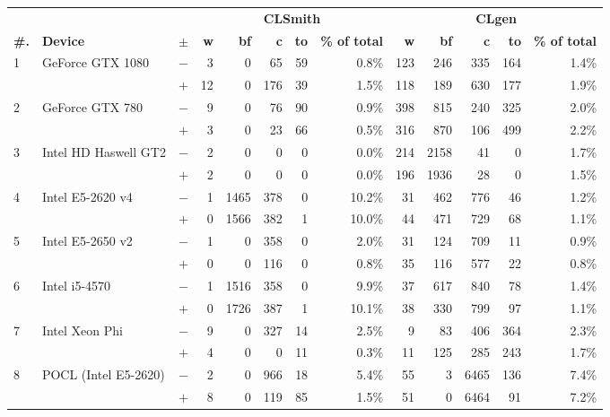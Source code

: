   \begin{tabular}{lll | rrrrr | rrrrr }
  \toprule
  & & & \multicolumn{5}{c|}{\textbf{CLSmith}} & \multicolumn{5}{c}{\textbf{CLgen}} \\
  \textbf{\#.} & \textbf{Device} & $\pm$ &
  \textbf{w} & \textbf{bf} & \textbf{c} & \textbf{to} & \textbf{\% of total} &
  \textbf{w} & \textbf{bf} & \textbf{c} & \textbf{to} & \textbf{\% of total} \\
  \midrule
  \multirow{ 2}{*}{1} & \multirow{ 2}{*}{GeForce GTX 1080} & $-$ & 3 & 0 & 65 & 59 & 0.8\%       & 123 & 246 & 335 & 164 & 1.4\% \\& & $+$ & 12 & 0 & 176 & 39 & 1.5\% & 118 & 189 & 630 & 177 & 1.9\% \\
\hline
\multirow{ 2}{*}{2} & \multirow{ 2}{*}{GeForce GTX 780} & $-$ & 9 & 0 & 76 & 90 & 0.9\%       & 398 & 815 & 240 & 325 & 2.0\% \\& & $+$ & 3 & 0 & 23 & 66 & 0.5\% & 316 & 870 & 106 & 499 & 2.2\% \\
\hline
\multirow{ 2}{*}{3} & \multirow{ 2}{*}{Intel HD Haswell GT2} & $-$ & 2 & 0 & 0 & 0 & 0.0\%       & 214 & 2158 & 41 & 0 & 1.7\% \\& & $+$ & 2 & 0 & 0 & 0 & 0.0\% & 196 & 1936 & 28 & 0 & 1.5\% \\
\hline
\multirow{ 2}{*}{4} & \multirow{ 2}{*}{Intel E5-2620 v4} & $-$ & 1 & 1465 & 378 & 0 & 10.2\%       & 31 & 462 & 776 & 46 & 1.2\% \\& & $+$ & 0 & 1566 & 382 & 1 & 10.0\% & 44 & 471 & 729 & 68 & 1.1\% \\
\hline
\multirow{ 2}{*}{5} & \multirow{ 2}{*}{Intel E5-2650 v2} & $-$ & 1 & 0 & 358 & 0 & 2.0\%       & 31 & 124 & 709 & 11 & 0.9\% \\& & $+$ & 0 & 0 & 116 & 0 & 0.8\% & 35 & 116 & 577 & 22 & 0.8\% \\
\hline
\multirow{ 2}{*}{6} & \multirow{ 2}{*}{Intel i5-4570} & $-$ & 1 & 1516 & 358 & 0 & 9.9\%       & 37 & 617 & 840 & 78 & 1.4\% \\& & $+$ & 0 & 1726 & 387 & 1 & 10.1\% & 38 & 330 & 799 & 97 & 1.1\% \\
\hline
\multirow{ 2}{*}{7} & \multirow{ 2}{*}{Intel Xeon Phi} & $-$ & 9 & 0 & 327 & 14 & 2.5\%       & 9 & 83 & 406 & 364 & 2.3\% \\& & $+$ & 4 & 0 & 0 & 11 & 0.3\% & 11 & 125 & 285 & 243 & 1.7\% \\
\hline
\multirow{ 2}{*}{8} & \multirow{ 2}{*}{POCL (Intel E5-2620)} & $-$ & 2 & 0 & 966 & 18 & 5.4\%       & 55 & 3 & 6465 & 136 & 7.4\% \\& & $+$ & 8 & 0 & 119 & 85 & 1.5\% & 51 & 0 & 6464 & 91 & 7.2\% \\

\end{tabular}

